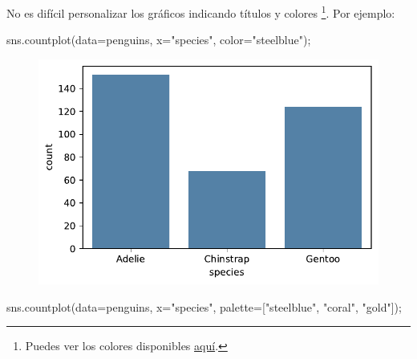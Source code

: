 \documentclass[
  a4paper,
  noprof,
  12pt,
  notoc,
  nosols,
  nobib]{mnye}
\newenvironment{Shaded}{\begin{snugshade}}{\end{snugshade}}
\newcommand{\NormalTok}[1]{\textcolor[rgb]{0.00,0.23,0.31}{#1}}
\newcommand{\OperatorTok}[1]{\textcolor[rgb]{0.37,0.37,0.37}{#1}}
\newcommand{\StringTok}[1]{\textcolor[rgb]{0.13,0.47,0.30}{#1}}
\theoremstyle{definition}
\theoremstyle{remark}
\begin{document}
No es difícil personalizar los gráficos indicando títulos y colores
\footnote{Puedes ver los colores disponibles
  \href{https://matplotlib.org/stable/tutorials/colors/colors.html}{aquí}.}.
Por ejemplo:

\begin{Shaded}
\begin{Highlighting}[]
\NormalTok{sns.countplot(data}\OperatorTok{=}\NormalTok{penguins, x}\OperatorTok{=}\StringTok{"species"}\NormalTok{, color}\OperatorTok{=}\StringTok{"steelblue"}\NormalTok{)}\OperatorTok{;}
\end{Highlighting}
\end{Shaded}

\begin{figure}[tbph]

{\centering \includegraphics{chapters/1categorical_files/figure-pdf/cell-17-output-1.pdf}

}

\end{figure}

\begin{Shaded}
\begin{Highlighting}[]
\NormalTok{sns.countplot(data}\OperatorTok{=}\NormalTok{penguins, x}\OperatorTok{=}\StringTok{"species"}\NormalTok{, palette}\OperatorTok{=}\NormalTok{[}\StringTok{"steelblue"}\NormalTok{, }\StringTok{"coral"}\NormalTok{, }\StringTok{"gold"}\NormalTok{])}\OperatorTok{;}
\end{Highlighting}
\end{Shaded}
\end{document}
